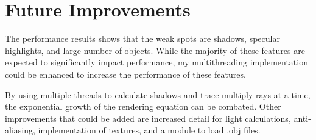 \documentclass{article}
\begin{document}
\section{Future Improvements}
The performance results shows that the weak spots are shadows, specular highlights, and large number of objects. While the majority of these features are expected to significantly impact performance, my multithreading implementation could be enhanced to increase the performance of these features.

By using multiple threads to calculate shadows and trace multiply rays at a time, the exponential growth of the rendering equation can be combated. Other improvements that could be added are increased detail for light calculations, anti-aliasing, implementation of textures, and a module to load .obj files. 
\end{document}

